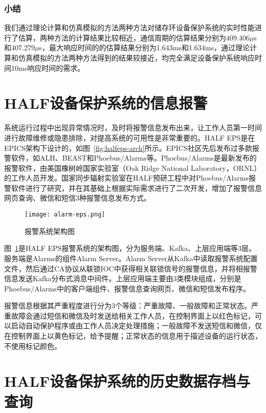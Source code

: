  \subsubsection{小结}

我们通过理论计算和仿真模拟的方法两种方法对储存环设备保护系统的实时性能进行了估算，两种方法的计算结果比较相近，通信周期的估算结果分别为409.406$\mu$s和407.279$\mu$s，最大响应时间的的估算结果分别为1.643ms和1.634ms，通过理论计算和仿真模拟的方法两种方法得到的结果较接近，均完全满足设备保护系统响应时间10ms响应时间的需求。

\section{HALF设备保护系统的信息报警}

系统运行过程中出现异常情况时，及时将报警信息发布出来，让工作人员第一时间进行故障维修或隐患排除，对提高系统的可用性是非常重要的。HALF EPS是在EPICS架构下设计的，如图~\ref{fig:halfeps-arch}所示。EPICS社区先后发布过多款报警软件，如ALH、BEAST和Phoebus/Alarms等\cite{alh,Kasemir-2009,Rosati-2017}。Phoebus/Alarms是最新发布的报警软件，由美国橡树岭国家实验室（Oak Ridge National Laboratory，ORNL）的工作人员开发。国家同步辐射实验室在HALF预研工程中对Phoebus/Alarms报警软件进行了研究，并在其基础上根据实际需求进行了二次开发，增加了报警信息网页查询、微信和短信3种报警信息发布方式\cite{chenxin-2019}。

\begin{figure}[!htb]
	\centering
	\texttt{[image: alarm-eps.png]}
	\caption{报警系统架构图}
	\label{fig:alarm-eps}
\end{figure}

图~\ref{fig:alarm-eps}是HALF EPS报警系统的架构图，分为服务端、Kafka、上层应用端等3层。服务端是Alarms的组件Alarm Server。Alarm Server从Kafka中读取报警系统配置文件，然后通过CA协议从联锁IOC中获得相关联锁信号的报警信息，并将相报警信息发送Kafka分布式消息中间件。上层应用端主要由3类模块组成，分别是Phoebus/Alarms中的客户端组件、报警信息查询网页、微信和短信发布程序。

报警信息根据其严重程度进行分为3个等级：严重故障、一般故障和正常状态。严重故障会通过短信和微信及时发送给相关工作人员，在控制界面上以红色标记，可以启动自动保护程序或由工作人员决定处理措施；一般故障不发送短信和微信，仅在控制界面上以黄色标记，给予提醒；正常状态的信息用于描述设备的运行状态，不使用标记颜色。

\section{HALF设备保护系统的历史数据存档与查询}


